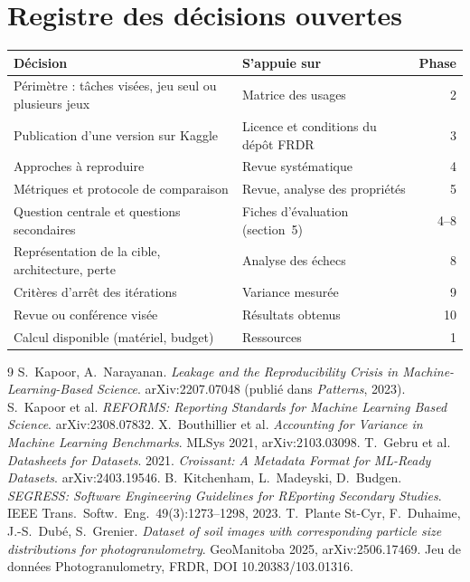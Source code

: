 \documentclass[11pt,a4paper]{article}
\begin{document}
\section{Registre des décisions ouvertes}

\par\smallskip
\begin{tabularx}{\textwidth}{@{}>{\raggedright\arraybackslash}p{6.2cm} X r@{}}
\toprule
\textbf{Décision} & \textbf{S'appuie sur} & \textbf{Phase}\\
\midrule
Périmètre : tâches visées, jeu seul ou plusieurs jeux & Matrice des usages & 2\\
Publication d'une version sur Kaggle & Licence et conditions du dépôt FRDR & 3\\
Approches à reproduire & Revue systématique & 4\\
Métriques et protocole de comparaison & Revue, analyse des propriétés & 5\\
Question centrale et questions secondaires & Fiches d'évaluation (section~5) & 4--8\\
Représentation de la cible, architecture, perte & Analyse des échecs & 8\\
Critères d'arrêt des itérations & Variance mesurée & 9\\
Revue ou conférence visée & Résultats obtenus & 10\\
Calcul disponible (matériel, budget) & Ressources & 1\\
\bottomrule
\end{tabularx}

\begingroup\small
\begin{thebibliography}{9}
 S.~Kapoor, A.~Narayanan. \emph{Leakage and the Reproducibility Crisis in Machine-Learning-Based Science}. arXiv:2207.07048 (publié dans \emph{Patterns}, 2023).
 S.~Kapoor et al. \emph{REFORMS: Reporting Standards for Machine Learning Based Science}. arXiv:2308.07832.
 X.~Bouthillier et al. \emph{Accounting for Variance in Machine Learning Benchmarks}. MLSys 2021, arXiv:2103.03098.
 T.~Gebru et al. \emph{Datasheets for Datasets}. 2021.
 \emph{Croissant: A Metadata Format for ML-Ready Datasets}. arXiv:2403.19546.
 B.~Kitchenham, L.~Madeyski, D.~Budgen. \emph{SEGRESS: Software Engineering Guidelines for REporting Secondary Studies}. IEEE Trans.\ Softw.\ Eng.\ 49(3):1273--1298, 2023.
 T.~Plante St-Cyr, F.~Duhaime, J.-S.~Dubé, S.~Grenier. \emph{Dataset of soil images with corresponding particle size distributions for photogranulometry}. GeoManitoba 2025, arXiv:2506.17469. Jeu de données Photogranulometry, FRDR, DOI 10.20383/103.01316.
\end{thebibliography}
\endgroup
\end{document}
